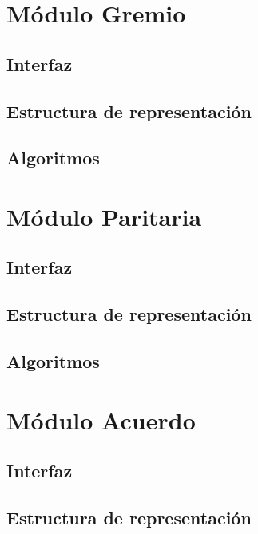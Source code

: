 \documentclass[10pt, a4paper]{article}
\begin{document}
\maketitle
\tableofcontents
\newpage

\section{Módulo Gremio} 
\subsection{Interfaz}

\subsection{Estructura de representaci\'on}

\subsection{Algoritmos}

\newpage

\section{Módulo Paritaria} 
\subsection{Interfaz}

\subsection{Estructura de representaci\'on}

\subsection{Algoritmos}

\newpage

\section{Módulo Acuerdo} 
\subsection{Interfaz}

\subsection{Estructura de representaci\'on}

\end{document}

